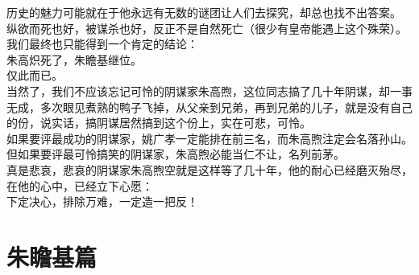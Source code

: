 \begin{multicols}{\theparacolNo}
历史的魅力可能就在于他永远有无数的谜团让人们去探究，却总也找不出答案。\\

纵欲而死也好，被谋杀也好，反正不是自然死亡（很少有皇帝能遇上这个殊荣）。\\

我们最终也只能得到一个肯定的结论：\\

朱高炽死了，朱瞻基继位。\\

仅此而已。\\

当然了，我们不应该忘记可怜的阴谋家朱高煦，这位同志搞了几十年阴谋，却一事无成，多次眼见煮熟的鸭子飞掉，从父亲到兄弟，再到兄弟的儿子，就是没有自己的份，说实话，搞阴谋居然搞到这个份上，实在可悲，可怜。\\

如果要评最成功的阴谋家，姚广孝一定能排在前三名，而朱高煦注定会名落孙山。\\

但如果要评最可怜搞笑的阴谋家，朱高煦必能当仁不让，名列前茅。\\

真是悲哀，悲哀的阴谋家朱高煦空就是这样等了几十年，他的耐心已经磨灭殆尽，在他的心中，已经立下心愿：\\

下定决心，排除万难，一定造一把反！\\
\ifnum{}
	\end{multicols}
\fi
\newpage
\chapter*{朱瞻基篇}
